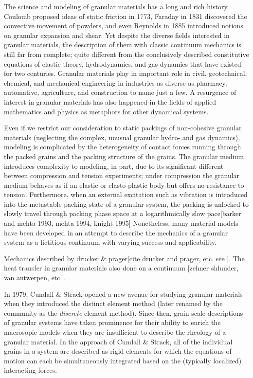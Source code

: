 The science and modeling of granular materials has a long and rich history. Coulomb proposed ideas of static friction in 1773, Faraday in 1831 discovered the convective movement of powders, and even Reynolds in 1885 introduced notions on granular expansion and shear.\cite{Jaeger1996a} Yet despite the diverse fields interested in granular materials, the description of them with classic continuum mechanics is still far from complete; quite different from the conclusively described constitutive equations of elastic theory, hydrodynamics, and gas dynamics that have existed for two centuries.\cite{Sadovskaya2012} Granular materials play in important role in civil, geotechnical, chemical, and mechanical engineering in industries as diverse as pharmacy, automative, agriculture, and construction to name just a few.\cite{Hill} A resurgence of interest in granular materials has also happened in the fields of applied mathematics and physics as metaphors for other dynamical systems.\cite{Jaeger1996a}

Even if we restrict our consideration to static packings of non-cohesive granular materials (neglecting the complex, unusual granular hydro- and gas dynamics), modeling is complicated by the heterogeneity of contact forces running through the packed grains and the packing structure of the grains.  The granular medium introduces complexity to modeling, in part, due to its significant different between compression and tension experiments; under compression the granular medium behaves as if an elastic or elasto-plastic body but offers no resistance to tension. Furthermore, when an external excitation such as vibration is introduced into the metastable packing state of a granular system, the packing is unlocked to slowly travel through packing phase space at a logarithmically slow pace[barker and mehta 1993, mehta 1994, knight 1995] Nonetheless, many material models have been developed in an attempt to describe the mechanics of a granular system as a fictitious continuum with varying success and applicability.

Mechanics described by drucker \& prager[cite drucker and prager, etc. see \cite{Hill}]. The heat transfer in granular materials also done on a continuum [zehner shlunder, van antwerpen, etc.]. 

In 1979, Cundall \& Strack opened a new avenue for studying granular materials when they introduced the distinct element method (later renamed by the community as the \textit{discrete} element method).\cite{Cundall1979} Since then, grain-scale descriptions of granular systems have taken prominence for their ability to enrich the macrosopic models when they are insufficient to describe the rheology of a granular material. In the approach of Cundall \& Strack, all of the individual grains in a system are described as rigid elements for which the equations of motion can each be simultaneously integrated based on the (typically localized) interacting forces.

